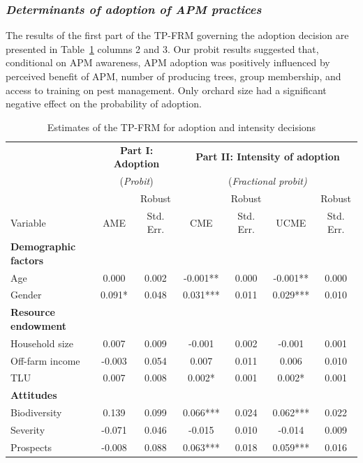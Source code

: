 \documentclass[fleqn,twoside,reqno]{article}
\begin{document}
\subsubsection{\textit{Determinants of adoption of APM practices}}
The results of the first part of the TP-FRM governing the adoption decision are presented in Table~\ref{tab:4} columns 2 and 3. Our probit results suggested that, conditional on APM awareness, APM adoption was positively influenced by perceived benefit of APM, number of producing trees, group membership, and access to training on pest management. Only orchard size had a significant negative effect on the probability of adoption.
\begin{table}[!ht]
\centering
\caption{Estimates of the TP-FRM for adoption and intensity decisions}
\label{tab:4}
\begin{adjustbox}{width=1\textwidth, center}
\begin{tabular}{lcccccc}
\toprule
& \multicolumn{2}{c}{\textbf{Part I: Adoption}} & \multicolumn{4}{c}{\textbf{Part II: Intensity of adoption}} \\
& \multicolumn{2}{c}{(\textit{Probit})} & \multicolumn{4}{c}{(\textit{Fractional probit)}} \\
\cmidrule(lr){2-3} \cmidrule(lr){4-7}
& & Robust & & Robust & & Robust \\
Variable & AME & Std. Err. & CME & Std. Err. & UCME & Std. Err. \\
\midrule
\textbf{Demographic factors} \\
Age & 0.000 & 0.002 & -0.001** & 0.000 & -0.001** & 0.000 \\
Gender & 0.091* & 0.048 & 0.031*** & 0.011 & 0.029*** & 0.010 \\

\textbf{Resource endowment} \\
Household size & 0.007 & 0.009 & -0.001 & 0.002 & -0.001 & 0.001 \\
Off-farm income & -0.003 & 0.054 & 0.007 & 0.011 & 0.006 & 0.010 \\
TLU & 0.007 & 0.008 & 0.002* & 0.001 & 0.002* & 0.001 \\

\textbf{Attitudes} \\
Biodiversity & 0.139 & 0.099 & 0.066*** & 0.024 & 0.062*** & 0.022 \\
Severity & -0.071 & 0.046 & -0.015 & 0.010 & -0.014 & 0.009 \\
Prospects & -0.008 & 0.088 & 0.063*** & 0.018 & 0.059*** & 0.016 \\


\end{tabular}
\end{adjustbox}
\end{table}
\end{document}
